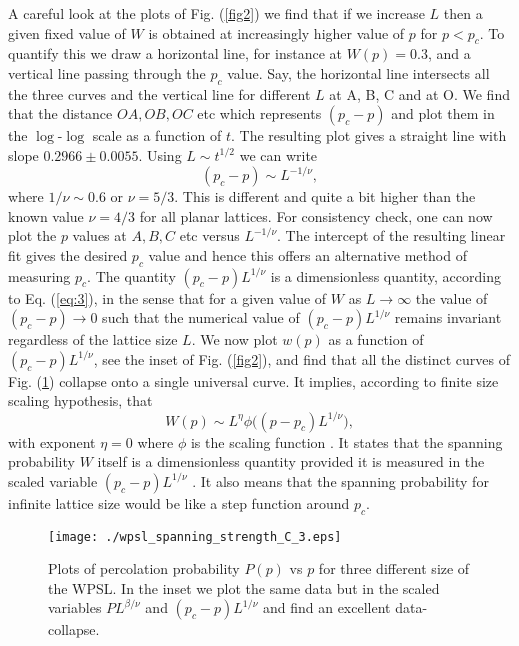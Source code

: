 ﻿\documentclass[twocolumn,showpacs,preprintnumbers,amsmath,amssymb]{revtex4}
\begin{document}
A careful look at the plots of Fig. (\ref{fig2}) we find that if we increase $L$ then a given fixed value of $W$ is obtained at increasingly higher value of $p$ for $p<p_c$. 
To quantify this 
we draw a horizontal line, for instance at $W(p)=0.3$, and a vertical line passing through the $p_c$ value. Say, the
horizontal line intersects all the three curves and the vertical line for different $L$ at A, B, C and at O. 
We find that the distance $OA, OB, OC$ etc which represents $(p_c-p)$ and plot them in the $\log$-$\log$ scale as a function
of $t$. The resulting plot gives a straight line with slope $0.2966\pm 0.0055$. Using $L\sim t^{1/2}$ we can write
\begin{equation}
\label{eq:3}
(p_c-p) \sim L^{-1/\nu},
\end{equation}
where $1/\nu \sim 0.6$ or $\nu=5/3$. This is different and quite a bit higher than the known value $\nu=4/3$ for all planar lattices. For consistency check, one can now
plot the $p$ values at $A, B, C$ etc versus $L^{-1/\nu}$. The intercept of the resulting linear fit gives the desired $p_c$ value 
and hence this offers an alternative method of measuring $p_c$. The quantity 
$(p_c-p)L^{1/\nu}$ is a dimensionless quantity, according to Eq. (\ref{eq:3}), in the sense that for a given value of $W$ as $L\rightarrow \infty$ the value of $(p_c-p)\rightarrow 0$ 
such that the numerical value of $(p_c-p)L^{1/\nu}$ remains invariant regardless of the lattice
size $L$. We now plot $w(p)$ as a function of $(p_c-p)L^{1/\nu}$, see the inset of Fig. (\ref{fig2}), and find that all the distinct curves of
Fig. (\ref{fig3}) collapse onto a single universal curve. It implies, according to finite size scaling hypothesis, that
\begin{equation}
W(p)\sim L^\eta \phi\Big( (p-p_c)L^{1/\nu}\Big ), 
\end{equation}
with exponent $\eta=0$ where $\phi$ is the scaling function \cite{ref.saberi}. It states that the spanning probability $W$ itself is a dimensionless quantity provided it is measured in the scaled variable  
$(p_c-p)L^{1/\nu}$ \cite{ref.barenblatt}. 
It also means that the spanning probability for infinite lattice size would be
like a step function around $p_c$. 


\begin{figure}
\label{fig3}
\texttt{[image: ./wpsl\_spanning\_strength\_C\_3.eps]}
\caption{Plots of percolation probability $P(p)$ vs $p$ for three different size of the WPSL. In the
inset we plot the same data but in the scaled variables $PL^{\beta/\nu}$ and $(p_c-p)L^{1/\nu}$ and  find an excellent data-collapse.
\label{fig3}
}
\end{figure}
\end{document}
